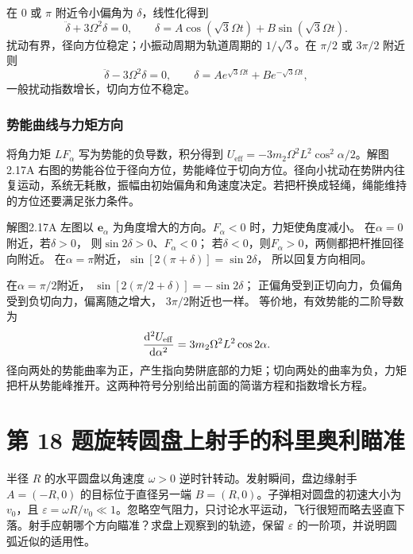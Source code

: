 \documentclass[UTF8,fontset=fandol,a4paper,11pt]{ctexart}
\newcommand{\dd}{\mathop{}\!\mathrm{d}}
\newcommand{\vect}[1]{\bm{#1}}
\newcommand{\tagline}[1]{\noindent{\small\color{muted}#1}\par}
\begin{document}
在 $0$ 或 $\pi$ 附近令小偏角为 $\delta$，线性化得到
\[
\ddot\delta+3\Omega^2\delta=0,
\qquad \delta=A\cos(\sqrt3\Omega t)+B\sin(\sqrt3\Omega t).
\]
扰动有界，径向方位稳定；小振动周期为轨道周期的 $1/\sqrt3$。在 $\pi/2$ 或 $3\pi/2$ 附近则
\[
\ddot\delta-3\Omega^2\delta=0,
\qquad\delta=Ae^{\sqrt3\Omega t}+Be^{-\sqrt3\Omega t},
\]
一般扰动指数增长，切向方位不稳定。

\subsubsection*{势能曲线与力矩方向}
将角力矩 $LF_\alpha$ 写为势能的负导数，积分得到 $U_{\mathrm{eff}}=-3m_2\Omega^2L^2\cos^2\alpha/2$。解图2.17A 右图的势能谷位于径向方位，势能峰位于切向方位。径向小扰动在势阱内往复运动，系统无耗散，振幅由初始偏角和角速度决定。若把杆换成轻绳，绳能维持的方位还要满足张力条件。

解图2.17A 左图以 $\vect e_\alpha$ 为角度增大的方向。$F_\alpha<0$ 时，力矩使角度减小。
在$\alpha=0$附近，若$\delta>0$，
则$\sin2\delta>0$、$F_\alpha<0$；
若$\delta<0$，则$F_\alpha>0$，两侧都把杆推回径向附近。
在$\alpha=\pi$附近，$\sin[2(\pi+\delta)]=\sin2\delta$，
所以回复方向相同。

在$\alpha=\pi/2$附近，
$\sin[2(\pi/2+\delta)]=-\sin2\delta$；
正偏角受到正切向力，负偏角受到负切向力，偏离随之增大，
$3\pi/2$附近也一样。
等价地，有效势能的二阶导数为
\[
\frac{\dd^2U_{\rm eff}}{\dd\alpha^2}
=3m_2\Omega^2L^2\cos2\alpha.
\]
径向两处的势能曲率为正，产生指向势阱底部的力矩；切向两处的曲率为负，力矩把杆从势能峰推开。这两种符号分别给出前面的简谐方程和指数增长方程。




\section*{第 18 题\quad 旋转圆盘上射手的科里奥利瞄准}

\tagline{M-02-18}

半径 $R$ 的水平圆盘以角速度 $\omega>0$ 逆时针转动。发射瞬间，盘边缘射手 $A=(-R,0)$ 的目标位于直径另一端 $B=(R,0)$。子弹相对圆盘的初速大小为 $v_0$，且 $\varepsilon=\omega R/v_0\ll1$。忽略空气阻力，只讨论水平运动，飞行很短而略去竖直下落。射手应朝哪个方向瞄准？求盘上观察到的轨迹，保留 $\varepsilon$ 的一阶项，并说明圆弧近似的适用性。
\end{document}
